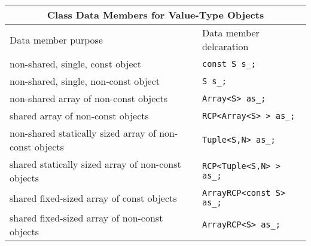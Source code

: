 \begin{tabular}{|l|l|}
%
\multicolumn{2}{c}{\textbf{Class Data Members for Value-Type Objects}} \\
%
\hline
Data member purpose
& Data member delcaration \\
\hline
\hline
non-shared, single, const object
& {}\texttt{const S s\_;} \\
\hline
non-shared, single, non-const object
& {}\texttt{S s\_;} \\
\hline
non-shared array of non-const objects
& {}\texttt{Array<S> as\_;} \\
\hline
shared array of non-const objects
& {}\texttt{RCP<Array<S> > as\_;} \\
\hline
non-shared statically sized array of non-const objects
& {}\texttt{Tuple<S,N> as\_;} \\
\hline
shared statically sized array of non-const objects
& {}\texttt{RCP<Tuple<S,N> > as\_;} \\
\hline
shared fixed-sized array of const objects
& {}\texttt{ArrayRCP<const S> as\_;} \\
\hline
shared fixed-sized array of non-const objects
& {}\texttt{ArrayRCP<S> as\_;} \\
\hline
\end{tabular}
